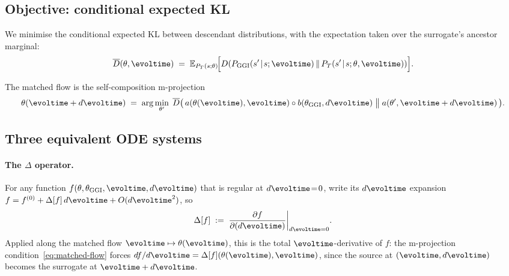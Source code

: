 \subsection{Objective: conditional expected KL}
\label{sec:comp-cond-kl}

We minimise the conditional expected KL between descendant distributions,
with the expectation taken over the surrogate's ancestor marginal:
\begin{equation}
\label{eq:cond-kl-objective}
\overline{D}(\theta,\evoltime) \;=\;
\mathbb{E}_{P_T(s;\theta)}\!\Bigl[\dkl{P_\ggi(s'\!\mid\! s;\evoltime)}
{P_T(s'\!\mid\! s;\theta,\evoltime)}\Bigr].
\end{equation}

The matched flow is the self-composition m-projection
\begin{equation}
\label{eq:matched-flow}
\theta(\evoltime+d\evoltime) \;=\; \arg\min_{\theta'}\;
\overline{D}\bigl(\,\jointpairhmm(\theta(\evoltime),\evoltime)\circ\condpairhmm(\theta_\ggi,d\evoltime)\;\big\|\;\jointpairhmm(\theta',\evoltime+d\evoltime)\,\bigr).
\end{equation}

\subsection{Three equivalent ODE systems}
\label{sec:comp-ode}

\paragraph{The $\Delta$ operator.}
For any function $f(\theta,\theta_\ggi,\evoltime,d\evoltime)$ that is regular
at $d\evoltime\!=\!0$, write its $d\evoltime$ expansion
$f = f^{(0)} + \Delta[f]\,d\evoltime + O(d\evoltime^2)$, so
\begin{equation}
\label{eq:delta-def}
\Delta[f] \;:=\; \frac{\partial f}{\partial(d\evoltime)}\bigg|_{d\evoltime=0}.
\end{equation}
Applied along the matched flow $\evoltime\mapsto\theta(\evoltime)$, this is
the total $\evoltime$-derivative of $f$: the m-projection
condition~\eqref{eq:matched-flow} forces
$df/d\evoltime = \Delta[f](\theta(\evoltime),\evoltime)$, since the source
at $(\evoltime,d\evoltime)$ becomes the surrogate at $\evoltime+d\evoltime$.

